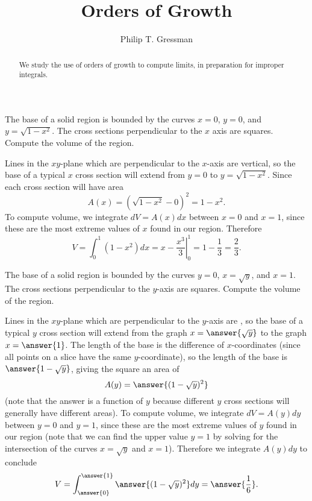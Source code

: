 \documentclass{ximera}
\title{Orders of Growth}
\author{Philip T. Gressman}
\begin{document}
\begin{abstract}
We study the use of orders of growth to compute limits, in preparation for improper integrals.
\end{abstract}
\maketitle

\begin{example}
The base of a solid region is bounded by the curves $x = 0$, $y= 0$, and $y = \sqrt{1-x^2}$. The cross sections perpendicular to the $x$ axis are squares. Compute the volume of the region.
\begin{solution}
Lines in the $xy$-plane which are perpendicular to the $x$-axis are vertical, so the base of a typical $x$ cross section will extend from $y=0$ to $y = \sqrt{1-x^2}$. Since each cross section will have area
\[ A(x) = \left( \sqrt{1-x^2} - 0 \right)^2 = 1-x^2. \]
To compute volume, we integrate $dV = A(x) dx$ between $x=0$ and $x=1$, since these are the most extreme values of $x$ found in our region. Therefore
\[ V = \int_0^1 ( 1 -x^2) dx = \left. x - \frac{x^3}{3} \right|_0^1 = 1 - \frac{1}{3} = \frac{2}{3}. \]
\end{solution}
\end{example}

\begin{example}
The base of a solid region is bounded by the curves $y = 0$, $x = \sqrt{y}$, and $x = 1$. The cross sections perpendicular to the $y$-axis are squares. Compute the volume of the region.
\begin{solution}
Lines in the $xy$-plane which are perpendicular to the $y$-axis are , so the base of a typical $y$ cross section will extend from the graph $x=\answer{\sqrt{y}}$ to the graph $x = \answer{1}$. The length of the base is the difference of $x$-coordinates (since all points on a slice have the same $y$-coordinate), so the length of the base is $\answer{1 - \sqrt{y}}$, giving the square an area of 
\[ A(y) = \answer{(1-\sqrt{y})^2} \]
(note that the answer is a function of $y$ because different $y$ cross sections will generally have different areas).
To compute volume, we integrate $dV = A(y) dy$ between $y=0$ and $y=1$, since these are the most extreme values of $y$ found in our region (note that we can find the upper value $y=1$ by solving for the intersection of the curves $x = \sqrt{y}$ and $x=1$). Therefore we integrate $A(y) dy$ to conclude
\[ V = \int_{\answer{0}}^{\answer{1}} \answer{(1-\sqrt{y})^2} dy = \answer{\frac{1}{6}}. \]
\end{solution}
\end{example}
\end{document}
